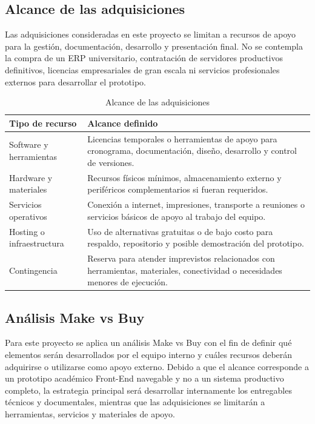 \documentclass[11pt,spanish]{article}
\begin{document}
\subsection{Alcance de las adquisiciones}

Las adquisiciones consideradas en este proyecto se limitan a recursos de apoyo para la gestión, documentación, desarrollo y presentación final. No se contempla la compra de un ERP universitario, contratación de servidores productivos definitivos, licencias empresariales de gran escala ni servicios profesionales externos para desarrollar el prototipo.

\begin{table}[H]
\centering
\caption{Alcance de las adquisiciones}
\label{tab:alcance-adquisiciones}
{\small
\begin{tabularx}{\textwidth}{p{4cm} Y}
\toprule
\textbf{Tipo de recurso} & \textbf{Alcance definido} \\
\midrule
Software y herramientas & Licencias temporales o herramientas de apoyo para cronograma, documentación, diseño, desarrollo y control de versiones. \\
Hardware y materiales & Recursos físicos mínimos, almacenamiento externo y periféricos complementarios si fueran requeridos. \\
Servicios operativos & Conexión a internet, impresiones, transporte a reuniones o servicios básicos de apoyo al trabajo del equipo. \\
Hosting o infraestructura & Uso de alternativas gratuitas o de bajo costo para respaldo, repositorio y posible demostración del prototipo. \\
Contingencia & Reserva para atender imprevistos relacionados con herramientas, materiales, conectividad o necesidades menores de ejecución. \\
\bottomrule
\end{tabularx}
}
\end{table}


\subsection{Análisis Make vs Buy}

Para este proyecto se aplica un análisis Make vs Buy con el fin de definir qué elementos serán desarrollados por el equipo interno y cuáles recursos deberán adquirirse o utilizarse como apoyo externo. Debido a que el alcance corresponde a un prototipo académico Front-End navegable y no a un sistema productivo completo, la estrategia principal será desarrollar internamente los entregables técnicos y documentales, mientras que las adquisiciones se limitarán a herramientas, servicios y materiales de apoyo.
\end{document}
